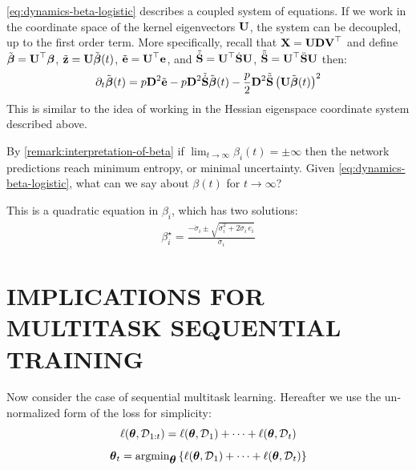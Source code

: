 \documentclass{article} %
\begin{document}
\begin{remark}
    \cref{eq:dynamics-beta-logistic} describes a coupled system of equations. If we work in the coordinate space of the kernel eigenvectors $\vU$, the system can be decoupled, up to the first order term. More specifically, recall that $\vX = \vU \vD \vV^\top $ and define $\tilde{\vbeta} = \vU^\top \vbeta$, $\tilde{\vz} = \vU \tilde{\vbeta}(t) $, $\tilde{\ve} = \vU^\top \ve$, and $\tilde{\dot\vS} = \vU^\top \dot\vS \vU$, $\tilde{\ddot\vS} = \vU^\top \ddot\vS \vU$ then:
\begin{align}
    \partial_t \tilde\vbeta(t) = p\vD^2\tilde\ve - p\vD^2 \tilde{\dot\vS} \tilde\vbeta(t) - \frac{p}{2}\vD^2 \tilde{\ddot\vS} \rnd{\vU \tilde{\vbeta}(t)}^2
\end{align}
This is similar to the idea of working in the Hessian eigenspace coordinate system described above. 
\end{remark}


By \cref{remark:interpretation-of-beta} if $\lim_{t\to\infty} \beta_i(t) = \pm \infty $ then the network predictions reach minimum entropy, or minimal uncertainty. 
Given \cref{eq:dynamics-beta-logistic}, what can we say about $\beta(t)$ for $t \to \infty$? 




\begin{prop}
    This is a quadratic equation in $\beta_i$, which has two solutions:
\begin{align}
    \beta_i^\star = \frac{-\dot\sigma_i \pm \sqrt{\dot\sigma_i^2 + 2 \ddot\sigma_i\,e_i}}{\ddot\sigma_i}
\end{align}
\end{prop}





\newpage

\section{IMPLICATIONS FOR MULTITASK SEQUENTIAL TRAINING}
Now consider the case of sequential multitask learning. Hereafter we use the un-normalized form of the loss for simplicity:
\begin{equation}
    \loss(\vparam, \data_{1:t}) = \loss(\vparam, \data_1) + \dots + \loss(\vparam, \data_t)
\end{equation}
\begin{equation}
    \vparam_t = \mbox{argmin}_{\vparam} \left\{ \loss(\vparam, \data_1) + \dots + \loss(\vparam, \data_t)\right\} 
\end{equation}
\end{document}
